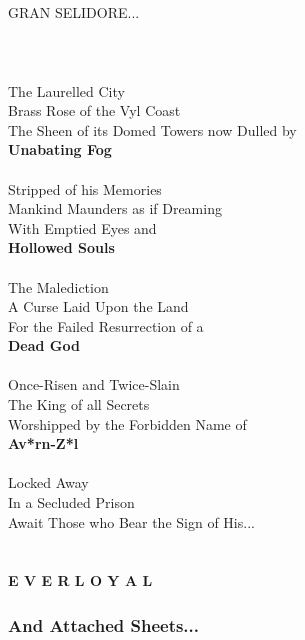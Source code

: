 \documentclass[12pt]{article}
\begin{document}
\begin{center}
\ \\
\ \\
{\Huge GRAN  SELIDORE...}\\
\ \\
\ \\
\ \\
{\Large The Laurelled City\\
Brass Rose of the Vyl Coast\\
The Sheen of its Domed Towers now Dulled by\\
\textbf{Unabating Fog}\\
\ \\
Stripped of his Memories\\
Mankind Maunders as if Dreaming\\
With Emptied Eyes and\\
\textbf{Hollowed Souls}\\
\ \\
The Malediction\\
A Curse Laid Upon the Land\\
For the Failed Resurrection of a\\
\textbf{Dead God}\\
\ \\
Once-Risen and Twice-Slain\\
The King of all Secrets\\
Worshipped by the Forbidden Name of\\
\textbf{Av*rn-Z*l}\\
\ \\
Locked Away\\
In a Secluded Prison\\
Await Those who Bear the Sign of His...\\
\ \\
\ \\
{\Huge \textbf{E V E R L O Y A L}}\
}
\end{center}

\pagebreak

\begin{multicols*}{2}

\renewcommand*\contentsname{Table of Contents}
\hypersetup{hidelinks}
\tableofcontents
{}
\subsubsection*{And Attached Sheets...}
\vfill

\pagebreak


\end{multicols*}
\end{document}
